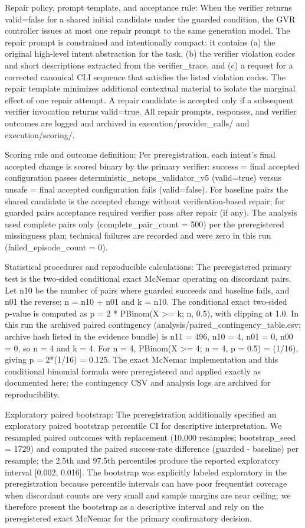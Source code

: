 \documentclass[conference]{IEEEtran}
\begin{document}
Repair policy, prompt template, and acceptance rule: When the verifier returns valid=false for a shared initial candidate under the guarded condition, the GVR controller issues at most one repair prompt to the same generation model. The repair prompt is constrained and intentionally compact: it contains (a) the original high‑level intent abstraction for the task, (b) the verifier violation codes and short descriptions extracted from the verifier\_trace, and (c) a request for a corrected canonical CLI sequence that satisfies the listed violation codes. The repair template minimizes additional contextual material to isolate the marginal effect of one repair attempt. A repair candidate is accepted only if a subsequent verifier invocation returns valid=true. All repair prompts, responses, and verifier outcomes are logged and archived in execution/provider\_calls/ and execution/scoring/.

Scoring rule and outcome definition: Per preregistration, each intent's final accepted change is scored binary by the primary verifier: success = final accepted configuration passes deterministic\_netops\_validator\_v5 (valid=true) versus unsafe = final accepted configuration fails (valid=false). For baseline pairs the shared candidate is the accepted change without verification‑based repair; for guarded pairs acceptance required verifier pass after repair (if any). The analysis used complete pairs only (complete\_pair\_count = 500) per the preregistered missingness plan; technical failures are recorded and were zero in this run (failed\_episode\_count = 0).

Statistical procedures and reproducible calculations: The preregistered primary test is the two‑sided conditional exact McNemar operating on discordant pairs. Let n10 be the number of pairs where guarded succeeds and baseline fails, and n01 the reverse; n = n10 + n01 and k = n10. The conditional exact two‑sided p‑value is computed as p = 2 * PBinom(X >= k; n, 0.5), with clipping at 1.0. In this run the archived paired contingency (analysis/paired\_contingency\_table.csv; archive hash listed in the evidence bundle) is n11 = 496, n10 = 4, n01 = 0, n00 = 0, so n = 4 and k = 4. For n = 4, PBinom(X >= 4; n = 4, p = 0.5) = (1/16), giving p = 2*(1/16) = 0.125. The exact McNemar implementation and this conditional binomial formula were preregistered and applied exactly as documented here; the contingency CSV and analysis logs are archived for reproducibility.

Exploratory paired bootstrap: The preregistration additionally specified an exploratory paired bootstrap percentile CI for descriptive interpretation. We resampled paired outcomes with replacement (10,000 resamples; bootstrap\_seed = 1729) and computed the paired success‑rate difference (guarded - baseline) per resample; the 2.5th and 97.5th percentiles produce the reported exploratory interval [0.002, 0.016]. The bootstrap was explicitly labeled exploratory in the preregistration because percentile intervals can have poor frequentist coverage when discordant counts are very small and sample margins are near ceiling; we therefore present the bootstrap as a descriptive interval and rely on the preregistered exact McNemar for the primary confirmatory decision.
\end{document}
